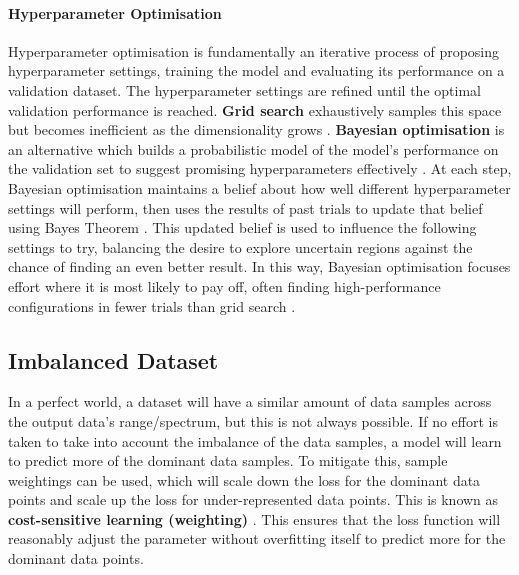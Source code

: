\paragraph{Hyperparameter Optimisation} Hyperparameter optimisation is fundamentally an iterative process of proposing hyperparameter settings, training the model and evaluating its performance on a validation dataset. The hyperparameter settings are refined until the optimal validation performance is reached. \textbf{Grid search} exhaustively samples this space but becomes inefficient as the dimensionality grows \cite{BayesianFasterThanGrid}. \textbf{Bayesian optimisation} is an alternative which builds a probabilistic model of the model's performance on the validation set to suggest promising hyperparameters effectively \cite{BayesOptimisationOriginal}. At each step, Bayesian optimisation maintains a belief about how well different hyperparameter settings will perform, then uses the results of past trials to update that belief using Bayes Theorem \cite{BayesTheorem}. This updated belief is used to influence the following settings to try, balancing the desire to explore uncertain regions against the chance of finding an even better result. In this way, Bayesian optimisation focuses effort where it is most likely to pay off, often finding high-performance configurations in fewer trials than grid search \cite{BayesianFasterThanGrid}.

\subsection{Imbalanced Dataset}
In a perfect world, a dataset will have a similar amount of data samples across the output data's range/spectrum, but this is not always possible. If no effort is taken to take into account the imbalance of the data samples, a model will learn to predict more of the dominant data samples. To mitigate this, sample weightings can be used, which will scale down the loss for the dominant data points and scale up the loss for under-represented data points. This is known as \textbf{cost-sensitive learning (weighting)} \cite{ImbalancedDataset}. This ensures that the loss function will reasonably adjust the parameter without overfitting itself to predict more for the dominant data points.

